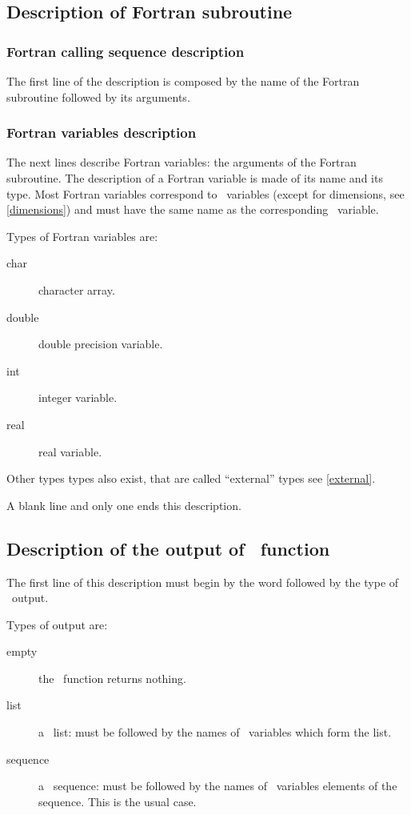 \documentclass[11pt]{article}
\begin{document}
\subsection{Description of Fortran subroutine}
\label{Fortran}
\subsubsection{Fortran calling sequence description}
The first line of the description is composed by the name of the 
Fortran subroutine followed by its arguments.


\subsubsection{Fortran variables description}

The next lines describe Fortran variables: the arguments of the Fortran
subroutine. 
The description of a Fortran variable is made of its name and its type.
Most Fortran variables correspond to \SCI\ variables (except for
dimensions, see \ref{dimensions}) and must have the same name as the
corresponding \SCI\ variable.

\smallskip

Types of Fortran variables are:
\begin{description}
  \item[char] character array.
  \item[double] double precision variable.
  \item[int] integer variable.
  \item[real] real variable.
\end{description}

Other types types also exist, that are called ``external'' types see \ref{external}.

\smallskip

A blank line and only one ends this description.

\subsection{Description of the output of \SCI\ function}
\label{output}

The first line of this description must begin by the word  followed
by the type of \SCI\ output.

\smallskip

Types of output are:
\begin{description}
  \item[empty] the \SCI\ function returns nothing.
  \item[list] a \SCI\ list: must be followed by the names of \SCI\ variables
which form the list.
  \item[sequence] a \SCI\ sequence: must be followed by the names of \SCI\
variables elements of the sequence. This is the usual case.
\end{description}
\end{document}
